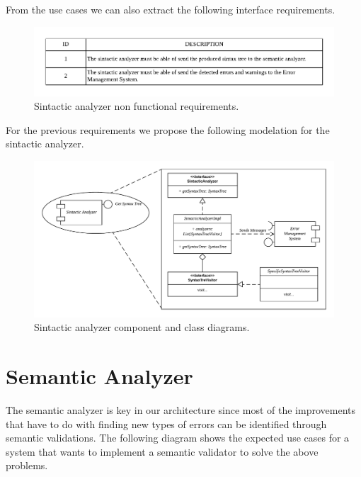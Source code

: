 From the use cases we can also extract the following interface requirements.

\begin{figure}[h!]
    \includegraphics[width=\textwidth]{images/sin-reqnf.pdf}
    \centering
    \caption[Sintactic analyzer non functional requirements]{Sintactic analyzer non functional requirements.}
    \label{fig:sin-reqnf}
\end{figure}

For the previous requirements we propose the following modelation for the sintactic analyzer.

\begin{figure}[h!]
    \includegraphics[width=\textwidth]{images/sin-diagram.pdf}
    \centering
    \caption[Sintactic analyzer component and class diagrams]{Sintactic analyzer component and class diagrams.}
    \label{fig:sin-diag}
\end{figure}

\section{Semantic Analyzer}
The semantic analyzer is key in our architecture since most of the improvements
that have to do with finding new types of errors can be identified through semantic
validations. The following diagram shows the expected use cases for a system that
wants to implement a semantic validator to solve the above problems.

